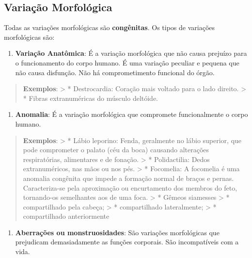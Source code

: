 \documentclass[
]{book}
\providecommand{\tightlist}{%
  \setlength{\itemsep}{0pt}\setlength{\parskip}{0pt}}
\begin{document}
\hypertarget{variauxe7uxe3o-morfoluxf3gica}{%
\subsection{Variação Morfológica}\label{variauxe7uxe3o-morfoluxf3gica}}

Todas as variações morfológicas são \textbf{congênitas}. Os tipos de variações morfológicas são:

\begin{enumerate}
\def\labelenumi{\arabic{enumi}.}
\tightlist
\item
  \textbf{Variação Anatômica}: É a variação morfológica que não causa prejuízo para o funcionamento do corpo humano. É uma variação peculiar e pequena que não causa disfunção. Não há comprometimento funcional do órgão.
\end{enumerate}

\begin{quote}
\textbf{Exemplos}:
\textgreater{} * Destrocardia: Coração mais voltado para o lado direito.
\textgreater{} * Fibras extranuméricas do músculo deltóide.
\end{quote}

\begin{enumerate}
\def\labelenumi{\arabic{enumi}.}
\setcounter{enumi}{1}
\tightlist
\item
  \textbf{Anomalia}: É a variação morfológica que compromete funcionalmente o corpo humano.
\end{enumerate}

\begin{quote}
\textbf{Exemplos}:
\textgreater{} * Lábio leporino: Fenda, geralmente no lábio superior, que pode comprometer o palato (céu da boca) causando alterações respiratórias, alimentares e de fonação.
\textgreater{} * Polidactilia: Dedos extranuméricos, nas mãos ou nos pés.
\textgreater{} * Focomelia: A focomelia é uma anomalia congênita que impede a formação normal de braços e pernas. Caracteriza-se pela aproximação ou encurtamento dos membros do feto, tornando-os semelhantes aos de uma foca.
\textgreater{} * Gêmeos siamesses
\textgreater{} * compartilhado pela cabeça;
\textgreater{} * compartilhado lateralmente;
\textgreater{} * compartilhado anteriormente
\end{quote}

\begin{enumerate}
\def\labelenumi{\arabic{enumi}.}
\setcounter{enumi}{2}
\tightlist
\item
  \textbf{Aberrações ou monstruosidades}: São variações morfológicas que prejudicam demasiadamente as funções corporais. São incompatíveis com a vida.
\end{enumerate}
\end{document}
